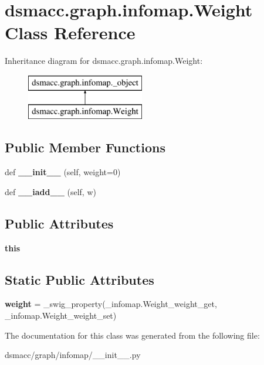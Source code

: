 \hypertarget{classdsmacc_1_1graph_1_1infomap_1_1Weight}{}\section{dsmacc.\+graph.\+infomap.\+Weight Class Reference}
\label{classdsmacc_1_1graph_1_1infomap_1_1Weight}
Inheritance diagram for dsmacc.\+graph.\+infomap.\+Weight\+:\begin{figure}[H]
\begin{center}
\leavevmode
\includegraphics[height=2.000000cm]{classdsmacc_1_1graph_1_1infomap_1_1Weight}
\end{center}
\end{figure}
\subsection*{Public Member Functions}
\begin{DoxyCompactItemize}
\item 
\mbox{\label{classdsmacc_1_1graph_1_1infomap_1_1Weight_a7ffeae56171fb0cea289af894e3a2a65}} 
def {\bfseries \+\_\+\+\_\+init\+\_\+\+\_\+} (self, weight=0)
\item 
\mbox{\label{classdsmacc_1_1graph_1_1infomap_1_1Weight_a601497511587e76d427b472fe3f84e20}} 
def {\bfseries \+\_\+\+\_\+iadd\+\_\+\+\_\+} (self, w)
\end{DoxyCompactItemize}
\subsection*{Public Attributes}
\begin{DoxyCompactItemize}
\item 
\mbox{\label{classdsmacc_1_1graph_1_1infomap_1_1Weight_a619abc9f22c6ab3e501dbb9a6259353b}} 
{\bfseries this}
\end{DoxyCompactItemize}
\subsection*{Static Public Attributes}
\begin{DoxyCompactItemize}
\item 
\mbox{\label{classdsmacc_1_1graph_1_1infomap_1_1Weight_a565193f97b6c50b6c7ee7264314ab63b}} 
{\bfseries weight} = \+\_\+swig\+\_\+property(\+\_\+infomap.\+Weight\+\_\+weight\+\_\+get, \+\_\+infomap.\+Weight\+\_\+weight\+\_\+set)
\end{DoxyCompactItemize}


The documentation for this class was generated from the following file\+:\begin{DoxyCompactItemize}
\item 
dsmacc/graph/infomap/\+\_\+\+\_\+init\+\_\+\+\_\+.\+py\end{DoxyCompactItemize}

